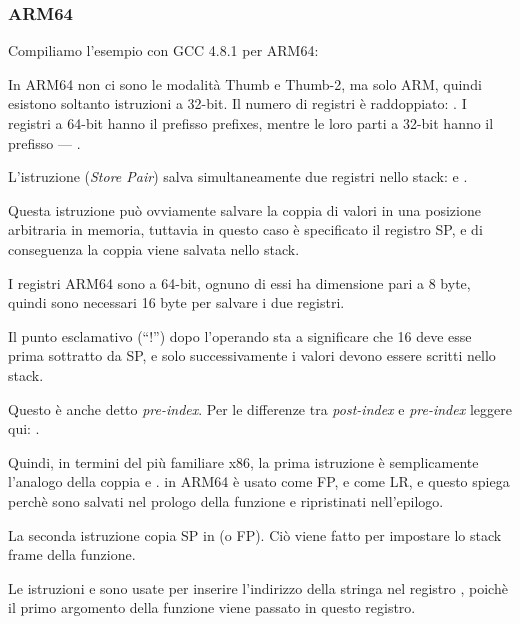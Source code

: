 \subsubsection{ARM64}


Compiliamo l'esempio con GCC 4.8.1 per ARM64:



In ARM64 non ci sono le modalità Thumb e Thumb-2, ma solo ARM, quindi esistono soltanto istruzioni a 32-bit.
Il numero di registri è raddoppiato: .
I registri a 64-bit hanno il prefisso  prefixes, mentre le loro parti a 32-bit hanno il prefisso --- .

L'istruzione  (\emph{Store Pair})
salva simultaneamente due registri nello stack:  e .

Questa istruzione può ovviamente salvare la coppia di valori in una posizione arbitraria in memoria, tuttavia in questo caso è
specificato il registro \ac{SP}, e di conseguenza la coppia viene salvata nello stack.

I registri ARM64 sono a 64-bit, ognuno di essi ha dimensione pari a 8 byte, quindi sono necessari 16 byte per salvare i due registri.

Il punto esclamativo (``!'') dopo l'operando sta a significare che 16 deve esse prima sottratto da \ac{SP}, e solo successivamente
i valori devono essere scritti nello stack.

Questo è anche detto \emph{pre-index}.
Per le differenze tra \emph{post-index} e \emph{pre-index}
leggere qui: .

Quindi, in termini del più familiare x86, la prima istruzione è semplicamente l'analogo della coppia
 e .
 in ARM64 è usato come \ac{FP}, e 
come \ac{LR}, e questo spiega perchè sono salvati nel prologo della funzione e ripristinati nell'epilogo.

La seconda istruzione copia \ac{SP} in  (o \ac{FP}).
Ciò viene fatto per impostare lo stack frame della funzione.

\label{pointers_ADRP_and_ADD}
Le istruzioni  e \ADD sono usate per inserire
l'indirizzo della stringa  nel registro ,
poichè il primo argomento della funzione viene passato in questo registro.

